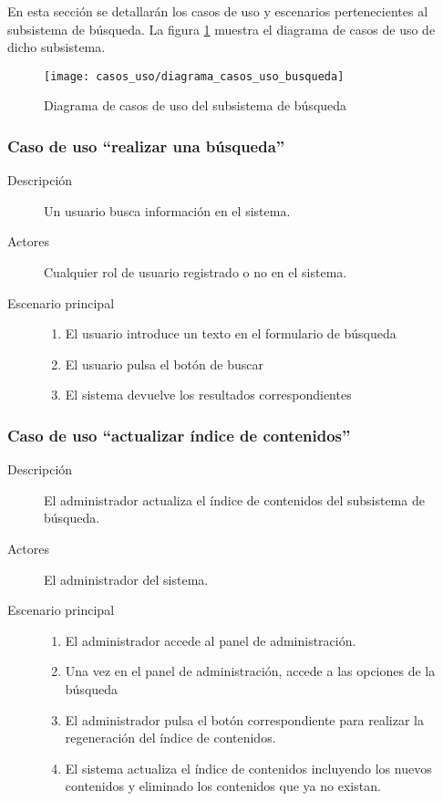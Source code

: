 En esta sección se detallarán los casos de uso y escenarios pertenecientes al subsistema de búsqueda. La figura \ref{fig:casos_uso_subsistema_busqueda} muestra el diagrama de casos de uso de dicho subsistema.

\begin{figure}[h]
\centering
\texttt{[image: casos\_uso/diagrama\_casos\_uso\_busqueda]}
\caption{Diagrama de casos de uso del subsistema de búsqueda}
\label{fig:casos_uso_subsistema_busqueda}
\end{figure}

\subsubsection{Caso de uso ``realizar una búsqueda''}
\begin{description}
\item[Descripción] Un usuario busca información en el sistema.
\item[Actores] Cualquier rol de usuario registrado o no en el sistema.
\item[Escenario principal] \hfill
							\begin{enumerate}
							\item El usuario introduce un texto en el formulario de búsqueda
							\item El usuario pulsa el botón de buscar
							\item El sistema devuelve los resultados correspondientes
							\end{enumerate}						
\end{description}

\subsubsection{Caso de uso ``actualizar índice de contenidos''}
\begin{description}
\item[Descripción] El administrador actualiza el índice de contenidos del subsistema de búsqueda.
\item[Actores] El administrador del sistema.
\item[Escenario principal] \hfill
							\begin{enumerate}
							\item El administrador accede al panel de administración.
							\item Una vez en el panel de administración, accede a las opciones de la búsqueda
							\item El administrador pulsa el botón correspondiente para realizar la regeneración del índice de contenidos.
							\item El sistema actualiza el índice de contenidos incluyendo los nuevos contenidos y eliminado los contenidos que ya no existan.
							\end{enumerate}						
\end{description}